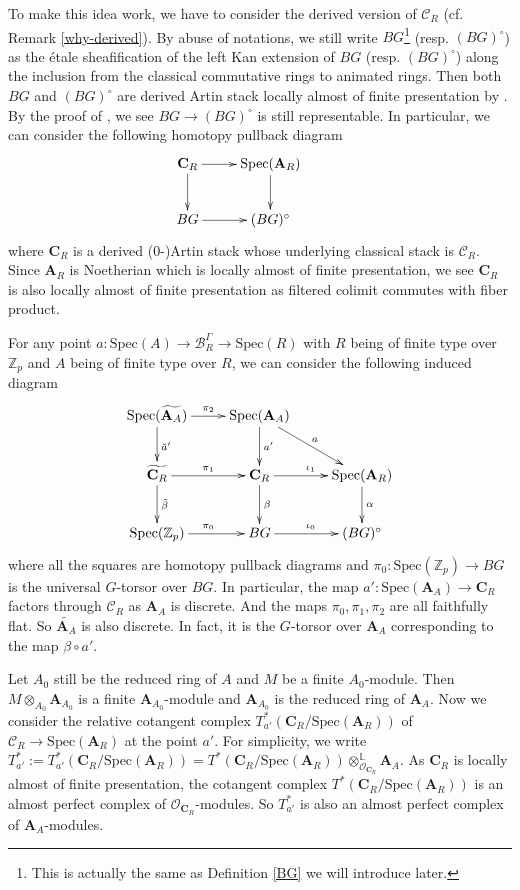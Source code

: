 \documentclass[10pt]{article}
\numberwithin{equation}{section}
\newcommand{\bL}{{\mathbb L}}
\newcommand{\bZ}{{\mathbb Z}}
\newcommand{\calB}{{\mathcal B}}
\newcommand{\calC}{{\mathcal C}}
\newcommand{\calO}{{\mathcal O}}
\newcommand{\Spec}{{\mathrm{Spec}}}         %
\newcommand{\bfA}{{\textbf{A}}}
\newcommand{\bfC}{{\textbf{C}}}
\begin{document}
To make this idea work, we have to consider the derived version of $\calC_R$ (cf. Remark \ref{why-derived}). By abuse of notations, we still write $BG$\footnote{This is actually the same as Definition \ref{BG} we will introduce later.} (resp. $(BG)^{\circ}$) as the \'etale sheafification of the left Kan extension of $BG$ (resp. $(BG)^{\circ}$) along the inclusion from the classical commutative rings to animated rings. Then both $BG$ and $(BG)^{\circ}$ are derived Artin stack locally almost of finite presentation by \cite[Proposition 4.4.3 and 4.5.2]{GR17}. By the proof of \cite[Proposition 4.4.3]{GR17}, we see $BG\to(BG)^{\circ}$ is still representable. In particular, we can consider the following homotopy pullback diagram
\begin{equation*}
    \xymatrix{
    \bfC_R\ar[r]\ar[d]&\Spec(\bfA_R)\ar[d]&\\
    BG\ar[r]&(BG)^{\circ}
    }
\end{equation*}
where $\bfC_R$ is a derived ($0$-)Artin stack whose underlying classical stack is $\calC_R$. Since $\bfA_R$ is Noetherian which is locally almost of finite presentation, we see $\bfC_R$ is also locally almost of finite presentation as filtered colimit commutes with fiber product.

For any point $a:\Spec(A)\to \calB_R^{\Gamma}\to \Spec(R)$ with $R$ being of finite type over $\bZ_p$ and $A$ being of finite type over $R$, we can consider the following induced diagram
\begin{equation}\label{diagram for continuity}
    \xymatrix{
    \Spec(\widetilde{\bfA_A})\ar[r]^{\pi_2}\ar[d]^{\tilde a'}&\Spec(\bfA_A)\ar[d]^{a'}\ar[rd]^{a}& \\
    \widetilde{\bfC_R}\ar[r]^{\pi_1}\ar[d]^{\tilde \beta}&\bfC_R\ar[r]^{\iota_1}\ar[d]^{\beta}& \Spec(\bfA_R)\ar[d]^{\alpha}\\
    \Spec(\bZ_p)\ar[r]^{\pi_0}& BG\ar[r]^{\iota_0}& (BG)^{\circ}
    }
\end{equation}
where all the squares are homotopy pullback diagrams and $\pi_0:\Spec(\bZ_p)\to BG$ is the universal $G$-torsor over $BG$. In particular, the map $a':\Spec(\bfA_A)\to \bfC_R$ factors through $\calC_R$ as $\bfA_A$ is discrete. And the maps $\pi_0,\pi_1,\pi_2$ are all faithfully flat. So $\widetilde{\bfA_A}$ is also discrete. In fact, it is the $G$-torsor over $\bfA_A$ corresponding to the map $\beta\circ a'$.


Let $A_0$ still be the reduced ring of $A$ and $M$ be a finite $A_0$-module. Then $M\otimes_{A_0}\bfA_{A_0}$ is a finite $\bfA_{A_0}$-module and $\bfA_{A_0}$ is the reduced ring of $\bfA_{A}$. Now we consider the relative cotangent complex $T^*_{a'}(\bfC_R/\Spec(\bfA_R))$ of $\calC_R\to \Spec(\bfA_R)$ at the point $a'$. For simplicity, we write $T^*_{a'}:=T^*_{a'}(\bfC_R/\Spec(\bfA_R))=T^*(\bfC_R/\Spec(\bfA_R))\otimes^{\bL}_{\calO_{\bfC_R}}\bfA_A$. As $\bfC_R$ is locally almost of finite presentation, the cotangent complex $T^*(\bfC_R/\Spec(\bfA_R))$ is an almost perfect complex of $\calO_{\bfC_R}$-modules. So $T^*_{a'}$ is also an almost perfect complex of $\bfA_A$-modules.
\end{document}
